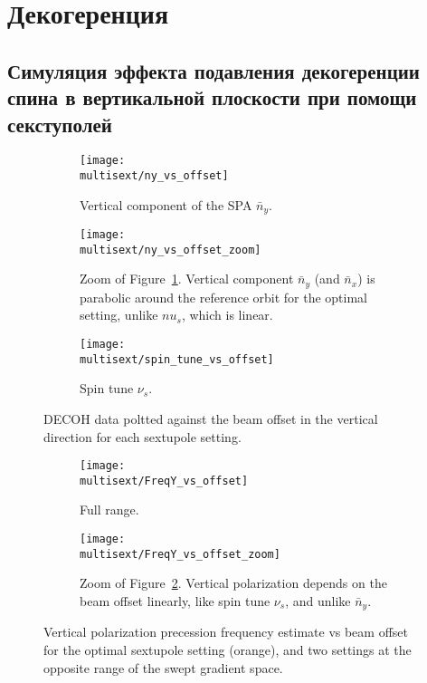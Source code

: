 \documentclass{report}
\newcommand{\Artem}{/home/alexa/REPOS/COSYINF/img/Artem}
\newcommand{\multisext}{\Artem/multisext_test}
\begin{document}
\section{Декогеренция}

\subsection{Симуляция эффекта подавления декогеренции спина в вертикальной плоскости при помощи секступолей}

\begin{figure}[H]
  \centering
  \begin{subfigure}[b]{\textwidth}
    \texttt{[image: \\multisext/ny\_vs\_offset]}
    \caption{Vertical component of the SPA $\bar n_y$.\label{fig:DECOH_full_ny}}
  \end{subfigure}

  \begin{subfigure}[b]{\textwidth}
    \texttt{[image: \\multisext/ny\_vs\_offset\_zoom]}
    \caption{Zoom of Figure~\ref{fig:DECOH_full_ny}. Vertical component $\bar n_y$ (and $\bar n_x$) is parabolic around the reference orbit for the optimal setting, unlike $nu_s$, which is linear.}
  \end{subfigure}
  
  \begin{subfigure}[b]{\textwidth}
    \texttt{[image: \\multisext/spin\_tune\_vs\_offset]}
    \caption{Spin tune $\nu_s$.}
  \end{subfigure}
  \caption{DECOH data poltted against the beam offset in the vertical direction for each sextupole setting.}
\end{figure}

\begin{figure}[H]
  \centering
  \begin{subfigure}[b]{\textwidth}
    \texttt{[image: \\multisext/FreqY\_vs\_offset]}
    \caption{Full range.\label{fig:FreqY_vs_offset}}
  \end{subfigure}

  \begin{subfigure}[b]{\textwidth}
    \texttt{[image: \\multisext/FreqY\_vs\_offset\_zoom]}
    \caption{Zoom of Figure~\ref{fig:FreqY_vs_offset}. Vertical polarization depends on the beam offset linearly, like spin tune $\nu_s$, and unlike $\bar n_y$.}
  \end{subfigure}
  \caption{Vertical polarization precession frequency estimate vs beam offset for the optimal sextupole setting (orange), and two settings at the opposite range of the swept gradient space.}
\end{figure}
\end{document}

